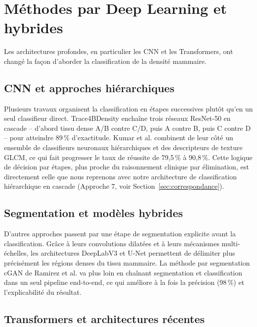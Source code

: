 \documentclass[12pt,a4paper]{report}
\begin{document}
\section{Méthodes par Deep Learning et hybrides}
Les architectures profondes, en particulier les CNN et les Transformers,
ont changé la façon d'aborder la classification de la densité mammaire.

\subsection{CNN et approches hiérarchiques}

Plusieurs travaux organisent la classification en étapes successives plutôt
qu'en un seul classifieur direct. Trace4BDensity \cite{trace4bdensity}
enchaîne trois réseaux ResNet-50 en cascade -- d'abord tissu dense A/B
contre C/D, puis A contre B, puis C contre D -- pour atteindre 89\,\%
d'exactitude. Kumar et al. \cite{ref22} combinent de leur côté un ensemble
de classifieurs neuronaux hiérarchiques et des descripteurs de texture GLCM,
ce qui fait progresser le taux de réussite de 79,5\,\% à 90,8\,\%. Cette
logique de décision par étapes, plus proche du raisonnement clinique par
élimination, est directement celle que nous reprenons avec notre
architecture de classification hiérarchique en cascade (Approche 7, voir
Section~\ref{sec:correspondance}).

\subsection{Segmentation et modèles hybrides}

D'autres approches passent par une étape de segmentation explicite avant la
classification. Grâce à leurs convolutions dilatées et à leurs mécanismes
multi-échelles, les architectures DeepLabV3 et U-Net permettent de délimiter
plus précisément les régions denses du tissu mammaire. La méthode par
segmentation cGAN de Ramirez et al. \cite{ref18} va plus loin en chaînant
segmentation et classification dans un seul pipeline end-to-end, ce qui
améliore à la fois la précision (98\,\%) et l'explicabilité du résultat.

\subsection{Transformers et architectures récentes}
\end{document}
